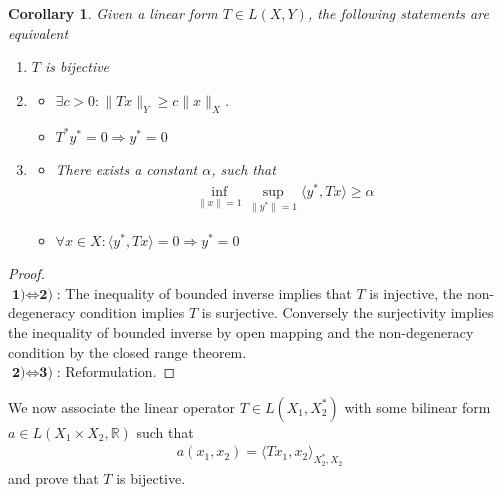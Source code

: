 \documentclass[a4paper,11pt,fleqn]{book}
\newtheorem{corollary}{Corollary}[theorem]
\theoremstyle{definition}
\theoremstyle{remark}
\begin{document}
\begin{corollary}
	Given a linear form $T \in L(X, Y)$, the following statements are equivalent
	\begin{enumerate}
		\item $T$ is bijective
		\item 
		\begin{itemize}
			\item $\exists c > 0: \|Tx \|_Y \ge  c \|x\|_X$.
			\item $T^* y^* = 0 \Rightarrow y^* = 0$
		\end{itemize}
		\item
		\begin{itemize}
			\item There exists a constant $\alpha$, such that
			\begin{align*}
			\inf_{\|x\| = 1} \sup_{\|y^*\| = 1} \langle y^*, Tx \rangle \ge \alpha
			\end{align*}
			\item $\forall x \in X: \langle y^*, Tx \rangle = 0 \Rightarrow y^* = 0$
		\end{itemize}
	\end{enumerate}
\end{corollary}
\begin{proof}\quad\\
	$\textbf{1)} \Leftrightarrow \textbf{2)}$: The inequality of bounded inverse implies that $T$ is injective, the non-degeneracy condition implies $T$ is surjective. Conversely the surjectivity implies the inequality of bounded inverse by open mapping and the non-degeneracy condition by the closed range theorem. \\
	$\textbf{2)} \Leftrightarrow \textbf{3)}$: Reformulation. 
\end{proof}

We now associate the linear operator $T \in L(X_1, X_2^*)$ with some bilinear form $a \in L(X_1 \times X_2, \mathbb{R})$ such that 
\begin{align*}
	a(x_1, x_2 ) = \langle T x_1, x_2 \rangle_{X_2^*, X_2} 
\end{align*}
and prove that $T$ is bijective. 
\end{document}
